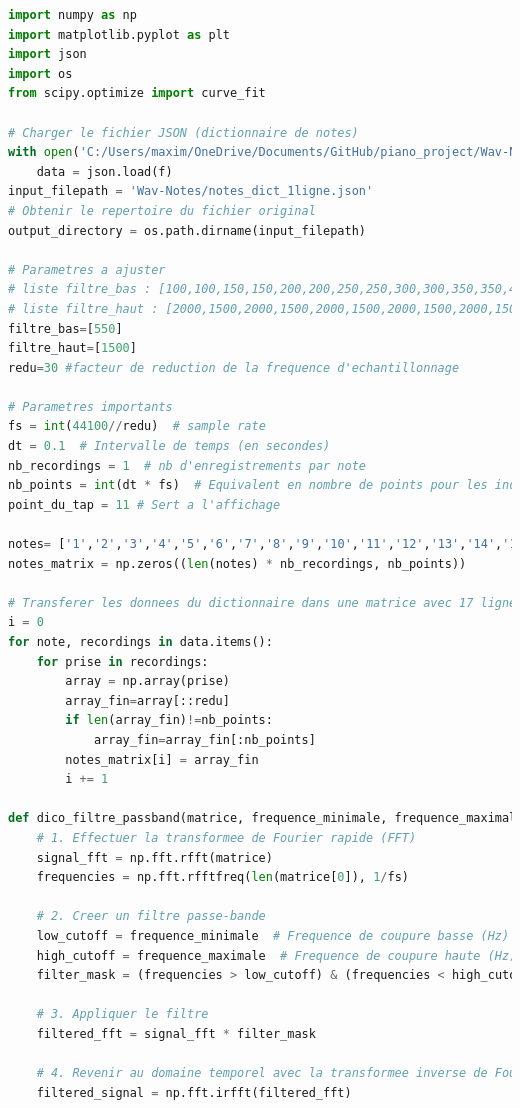 \documentclass[11pt,letterpaper]{article}
\begin{document}
\begin{lstlisting}[language=python]
import numpy as np
import matplotlib.pyplot as plt
import json
import os
from scipy.optimize import curve_fit

# Charger le fichier JSON (dictionnaire de notes)
with open('C:/Users/maxim/OneDrive/Documents/GitHub/piano_project/Wav-Notes/notes_dict_1ligne.json', 'r') as f:
    data = json.load(f)
input_filepath = 'Wav-Notes/notes_dict_1ligne.json'
# Obtenir le repertoire du fichier original
output_directory = os.path.dirname(input_filepath)

# Parametres a ajuster
# liste filtre_bas : [100,100,150,150,200,200,250,250,300,300,350,350,400,400,500,500]
# liste filtre_haut : [2000,1500,2000,1500,2000,1500,2000,1500,2000,1500,2000,1500,2000,1500,2000,1500]
filtre_bas=[550]
filtre_haut=[1500]
redu=30 #facteur de reduction de la frequence d'echantillonnage

# Parametres importants
fs = int(44100//redu)  # sample rate
dt = 0.1  # Intervalle de temps (en secondes)
nb_recordings = 1  # nb d'enregistrements par note
nb_points = int(dt * fs)  # Equivalent en nombre de points pour les indices
point_du_tap = 11 # Sert a l'affichage

notes= ['1','2','3','4','5','6','7','8','9','10','11','12','13','14','15','16','17']
notes_matrix = np.zeros((len(notes) * nb_recordings, nb_points))

# Transferer les donnees du dictionnaire dans une matrice avec 17 lignes et nb_points par ligne
i = 0
for note, recordings in data.items():
    for prise in recordings:
        array = np.array(prise)
        array_fin=array[::redu]
        if len(array_fin)!=nb_points:
            array_fin=array_fin[:nb_points]
        notes_matrix[i] = array_fin
        i += 1

def dico_filtre_passband(matrice, frequence_minimale, frequence_maximale):
    # 1. Effectuer la transformee de Fourier rapide (FFT)
    signal_fft = np.fft.rfft(matrice)
    frequencies = np.fft.rfftfreq(len(matrice[0]), 1/fs)

    # 2. Creer un filtre passe-bande
    low_cutoff = frequence_minimale  # Frequence de coupure basse (Hz)
    high_cutoff = frequence_maximale  # Frequence de coupure haute (Hz)
    filter_mask = (frequencies > low_cutoff) & (frequencies < high_cutoff)

    # 3. Appliquer le filtre
    filtered_fft = signal_fft * filter_mask

    # 4. Revenir au domaine temporel avec la transformee inverse de Fourier
    filtered_signal = np.fft.irfft(filtered_fft)
    

\end{lstlisting}
\end{document}
